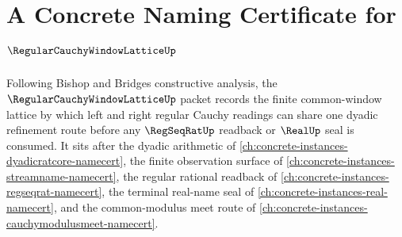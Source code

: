 \chapter{A Concrete Naming Certificate for $\RegularCauchyWindowLatticeUp$}
\label{ch:concrete-instances-regular-cauchy-window-lattice-namecert}

Following Bishop and Bridges constructive analysis, the $\RegularCauchyWindowLatticeUp$ packet records the finite common-window lattice by which left and right regular Cauchy readings can share one dyadic refinement route before any $\RegSeqRatUp$ readback or $\RealUp$ seal is consumed. It sits after the dyadic arithmetic of \autoref{ch:concrete-instances-dyadicratcore-namecert}, the finite observation surface of \autoref{ch:concrete-instances-streamname-namecert}, the regular rational readback of \autoref{ch:concrete-instances-regseqrat-namecert}, the terminal real-name seal of \autoref{ch:concrete-instances-real-namecert}, and the common-modulus meet route of \autoref{ch:concrete-instances-cauchymodulusmeet-namecert}.

